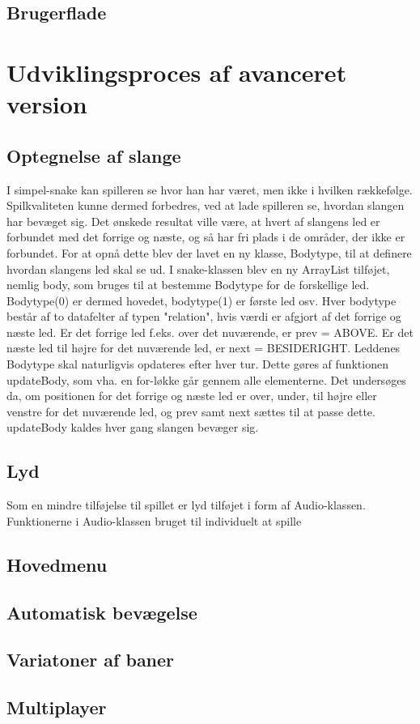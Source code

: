 \documentclass{report}
\begin{document}
\subsection{Brugerflade}


\section{Udviklingsproces  af avanceret version}

\subsection{Optegnelse af slange}

I simpel-snake kan spilleren se hvor han har været, men ikke i hvilken rækkefølge. Spilkvaliteten kunne dermed forbedres, ved at lade spilleren se, hvordan slangen har bevæget sig. Det ønskede resultat ville være, at hvert af slangens led er forbundet med det forrige og næste, og så har fri plads i de områder, der ikke er forbundet.
For at opnå dette blev der lavet en ny klasse, Bodytype, til at definere hvordan slangens led skal se ud. I snake-klassen blev en ny ArrayList tilføjet, nemlig body, som bruges til at bestemme Bodytype for de forskellige led. Bodytype(0) er dermed hovedet, bodytype(1) er første led osv. Hver bodytype består af to datafelter af typen "relation", hvis værdi er afgjort af det forrige og næste led. Er det forrige led f.eks. over det nuværende, er prev = ABOVE. Er det næste led til højre for det nuværende led, er next = BESIDERIGHT.
Leddenes Bodytype skal naturligvis opdateres efter hver tur. Dette gøres af funktionen updateBody, som vha. en for-løkke går gennem alle elementerne. Det undersøges da, om positionen for det forrige og næste led er over, under, til højre eller venstre for det nuværende led, og prev samt next sættes til at passe dette. updateBody kaldes hver gang slangen bevæger sig.

\subsection{Lyd}

Som en mindre tilføjelse til spillet er lyd tilføjet i form af Audio-klassen. Funktionerne i Audio-klassen bruget til individuelt at spille 

\subsection{Hovedmenu}


\subsection{Automatisk bevægelse}

\subsection{Variatoner af baner}

\subsection{Multiplayer}
\end{document}

